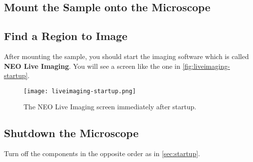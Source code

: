 \documentclass[10pt,a4paper,oneside]{book}
\begin{document}
\subsection{Mount the Sample onto the Microscope}

\subsection{Find a Region to Image}

After mounting the sample, you should start the imaging software which is called \textbf{NEO Live Imaging}. You will see a screen like the one in \autoref{fig:liveimaging-startup}.

\begin{figure}[ht]
    \centering
    \texttt{[image: liveimaging-startup.png]}
    \caption{The NEO Live Imaging screen immediately after startup.}
    \label{fig:liveimaging-startup}
\end{figure}

\subsection{Shutdown the Microscope}

Turn off the components in the opposite order as in \autoref{sec:startup}.
\end{document}
